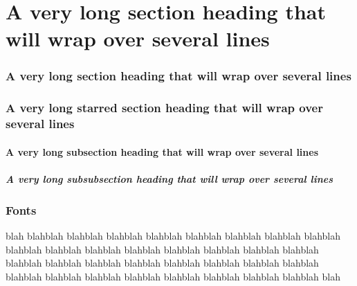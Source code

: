 \documentclass[a4paper,serif]{module}
\begin{document}
%

\part{A very long section heading that will wrap over several lines}

\section{A very long section heading that will wrap over several lines}

\section*{A very long starred section heading that will wrap over several lines}

\subsection{A very long subsection heading that will wrap over several lines}

\subsubsection{A very long subsubsection heading that will wrap over several lines}

\section{Fonts}

blah blahblah blahblah blahblah blahblah blahblah blahblah blahblah blahblah blahblah blahblah blahblah blahblah blahblah blahblah blahblah blahblah blahblah blahblah blahblah blahblah blahblah blahblah blahblah blahblah blahblah blahblah blahblah blahblah blahblah blahblah blahblah blahblah blah                                 

\end{document}
